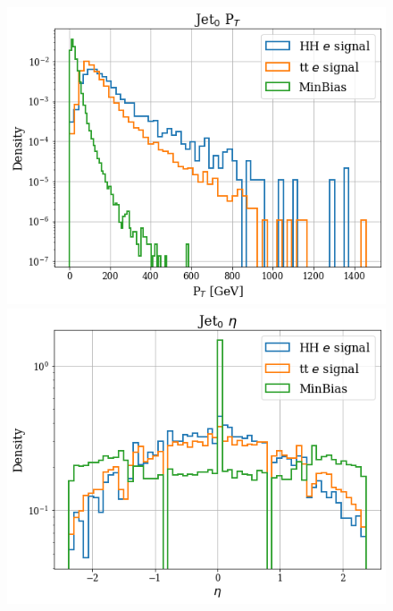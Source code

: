 \documentclass[../main.tex]{subfiles}
\begin{document}
 \begin{figure}[!ht]
  \begin{minipage}[b]{0.33\linewidth}
    \centering
    \includegraphics[width=1\linewidth]{Chapters/Plots/Hist_1ele_jet0_Et.png}
  \end{minipage}%
  \begin{minipage}[b]{0.33\linewidth}
    \centering
    \includegraphics[width=1\linewidth]{Chapters/Plots/Hist_1ele_jet0_Eta.png}
  \end{minipage} %
  \begin{minipage}[b]{0.33\linewidth}

\end{minipage}
\end{figure}
\end{document}
